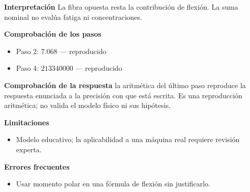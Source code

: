 \documentclass[10pt,openany]{book}
\begin{document}
\begin{tcolorbox}[title={Problema resuelto 3}, studiumworked, breakable]
\noindent\textbf{Interpretación}
La fibra opuesta resta la contribución de flexión. La suma nominal no evalúa fatiga ni concentraciones.

\noindent\textbf{Comprobación de los pasos}
\begin{itemize}
\item Paso 2: $7.068$ — reproducido
\item Paso 4: $213340000$ — reproducido
\end{itemize}

\noindent\textbf{Comprobación de la respuesta} la aritmética del último paso reproduce la respuesta enunciada a la precisión con que está escrita. Es una reproducción aritmética; no valida el modelo físico ni sus hipótesis.

\noindent\textbf{Limitaciones}
\begin{itemize}
\item Modelo educativo; la aplicabilidad a una máquina real requiere revisión experta.
\end{itemize}

\noindent\textbf{Errores frecuentes}
\begin{itemize}
\item Usar momento polar en una fórmula de flexión sin justificarlo.
\end{itemize}
\end{tcolorbox}
\end{document}

